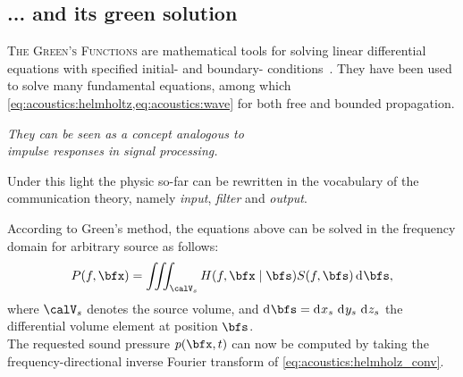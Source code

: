 \subsection{... and its green solution}
\textsc{The Green's Functions} are mathematical tools for solving linear differential equations with specified initial- and boundary- conditions~.
They have been used to solve many fundamental equations, among which \cref{eq:acoustics:helmholtz,eq:acoustics:wave} for both free and bounded propagation.
\begin{center}
    \textit{
    They can be seen as a concept analogous to
    \\ \emph{impulse responses}
    in signal processing.
    }
\end{center}
Under this light the physic so-far can be rewritten in the vocabulary of the communication theory, namely \textit{input}, \textit{filter} and \textit{output}.

According to Green's method, the equations above can be solved in the frequency domain for arbitrary source as follows:
\begin{equation}
    \label{eq:acoustics:helmholz_conv}
    P(f, \positionMicrophone) = \iiint_{\volume_\contSource} H(f, \positionMicrophone \mid \positionSource) S(f, \positionSource) \kdiff\positionSource
    ,
\end{equation}
where $\volume_\contSource$ denotes the source volume,
and  $\kdiff\positionSource =  \kdiff{x_\contSource}\,\kdiff{y_\contSource}\,\kdiff{z_\contSource}$ the  differential  volume element at position $\positionSource$.
\\The requested sound pressure $\pressureSpaceTime$ can now be computed by taking the frequency-directional inverse Fourier transform of \cref{eq:acoustics:helmholz_conv}.

